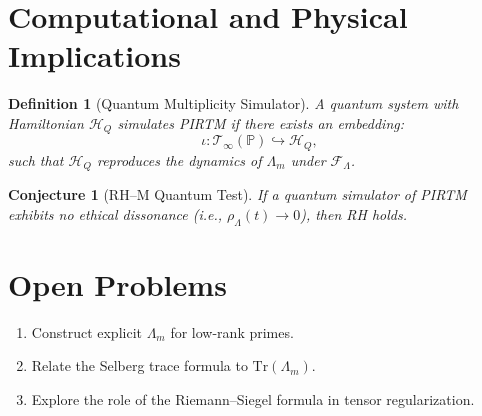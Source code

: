 \documentclass[12pt]{article}
\newtheorem{definition}[theorem]{Definition}
\newtheorem{conjecture}[theorem]{Conjecture}
\begin{document}
\section{Computational and Physical Implications}

\begin{definition}[Quantum Multiplicity Simulator]
A quantum system with Hamiltonian \(\mathcal{H}_Q\) \textit{simulates} PIRTM if there exists an embedding:
\[
\iota: \mathcal{T}_\infty(\mathbb{P}) \hookrightarrow \mathscr{H}_Q,
\]
such that \(\mathcal{H}_Q\) reproduces the dynamics of \(\Lambda_m\) under \(\mathscr{F}_\Lambda\).
\end{definition}

\begin{conjecture}[RH--M Quantum Test]
If a quantum simulator of PIRTM exhibits no ethical dissonance (i.e., \(\rho_\Lambda(t) \to 0\)), then RH holds.
\end{conjecture}

\section{Open Problems}
\begin{enumerate}
    \item Construct explicit \(\Lambda_m\) for low-rank primes.
    \item Relate the Selberg trace formula to \(\text{Tr}(\Lambda_m)\).
    \item Explore the role of the Riemann--Siegel formula in tensor regularization.
\end{enumerate}

\begin{center}
\end{center}
\end{document}
